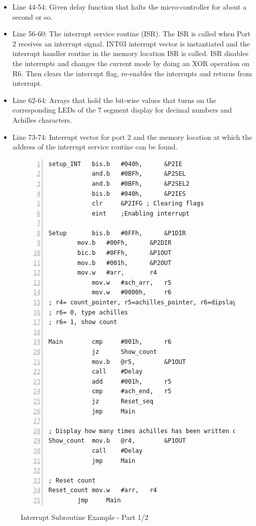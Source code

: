 \documentclass[pdftex,12pt,a4paper]{article}
\begin{document}
\begin{itemize}
    \item Line 44-54: Given delay function that halts the micro-controller for about a second or so.
    \item Line 56-60: The interrupt service routine (ISR). The ISR is called when Port 2 receives an interrupt signal. INT03 interrupt vector is instantiated and the interrupt handler routine in the memory location ISR is called. ISR disables the interrupts and changes the current mode by doing an XOR operation on R6. Then clears the interrupt flag, re-enables the interrupts and returns from interrupt.
    \item Line 62-64: Arrays that hold the bit-wise values that turns on the corresponding LEDs of the 7 segment display for decimal numbers and Achilles characters.
    \item Line 73-74: Interrupt vector for port 2 and the memory location at which the address of the interrupt service routine can be found.
\end{itemize}

\begin{figure}[H]
    \centering
\begin{lstlisting}[language={[x86masm]Assembler}, numbers=left]
setup_INT   bis.b   #040h,      &P2IE
            and.b   #0BFh,      &P2SEL
            and.b   #0BFh,      &P2SEL2
            bis.b   #040h,      &P2IES
            clr     &P2IFG ; Clearing flags
            eint    ;Enabling interrupt

Setup	    bis.b   #0FFh,      &P1DIR
	    mov.b   #00Fh,      &P2DIR
	    bic.b   #0FFh,      &P1OUT
	    mov.b   #001h,      &P2OUT
	    mov.w   #arr,       r4
            mov.w   #ach_arr,   r5
            mov.w   #0000h,     r6
; r4= count_pointer, r5=achilles_pointer, r6=dipslay status
; r6= 0, type achilles
; r6= 1, show count

Main        cmp     #001h,      r6
            jz      Show_count
            mov.b   @r5,        &P1OUT
            call    #Delay
            add     #001h,      r5
            cmp     #ach_end,   r5
            jz      Reset_seq
            jmp     Main

; Display how many times achilles has been written on the screen
Show_count  mov.b   @r4,        &P1OUT
            call    #Delay
            jmp     Main

; Reset count
Reset_count	mov.w	#arr,   r4
		jmp     Main
\end{lstlisting}
    \caption{Interrupt Subroutine Example - Part 1/2}
    \label{code:interrupt_1}
\end{figure}
\end{document}
